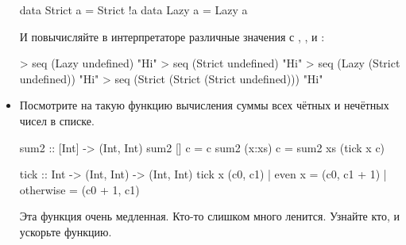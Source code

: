 \begin{itemize}
\begin{code}
data Strict a = Strict !a
data Lazy   a = Lazy    a
\end{code} 

И повычисляйте в интерпретаторе различные значения с ,
, \In{($!)} и :

\begin{code}
> seq (Lazy undefined) "Hi"
> seq (Strict undefined) "Hi"
> seq (Lazy (Strict undefined)) "Hi"
> seq (Strict (Strict (Strict undefined))) "Hi"
\end{code} 

\item Посмотрите на такую функцию вычисления суммы
        всех чётных и нечётных чисел в списке. 

\begin{code}
sum2 :: [Int] -> (Int, Int)
sum2 []     c = c
sum2 (x:xs) c = sum2 xs (tick x c)

tick :: Int -> (Int, Int) -> (Int, Int)
tick x (c0, c1) | even x    = (c0, c1 + 1)
                | otherwise = (c0 + 1, c1)
\end{code} 

    Эта функция очень медленная. Кто-то слишком много ленится.
    Узнайте кто, и ускорьте функцию.
   
\end{itemize}
